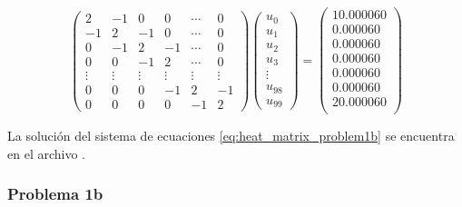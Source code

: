 \begin{itemize}
          \begin{equation}
              \begin{pmatrix}
                  2      & -1     & 0      & 0      & \cdots & 0      \\
                  -1     & 2      & -1     & 0      & \cdots & 0      \\
                  0      & -1     & 2      & -1     & \cdots & 0      \\
                  0      & 0      & -1     & 2      & \cdots & 0      \\
                  \vdots & \vdots & \vdots & \vdots & \vdots & \vdots \\
                  0      & 0      & 0      & -1     & 2      & -1     \\
                  0      & 0      & 0      & 0      & -1     & 2
              \end{pmatrix}
              \begin{pmatrix}
                  u_0    \\
                  u_1    \\
                  u_2    \\
                  u_3    \\
                  \vdots \\
                  u_{98} \\
                  u_{99}
              \end{pmatrix}
              =\begin{pmatrix}
                  10.000060 \\
                  0.000060  \\
                  0.000060  \\
                  0.000060  \\
                  0.000060  \\
                  0.000060  \\
                  20.000060 \\
              \end{pmatrix}
              \label{eq:heat_matrix_problem1b}
          \end{equation}

          La solución del sistema de ecuaciones \ref{eq:heat_matrix_problem1b} se encuentra en el archivo .
\end{itemize}
\subsubsection{Problema 1b}

